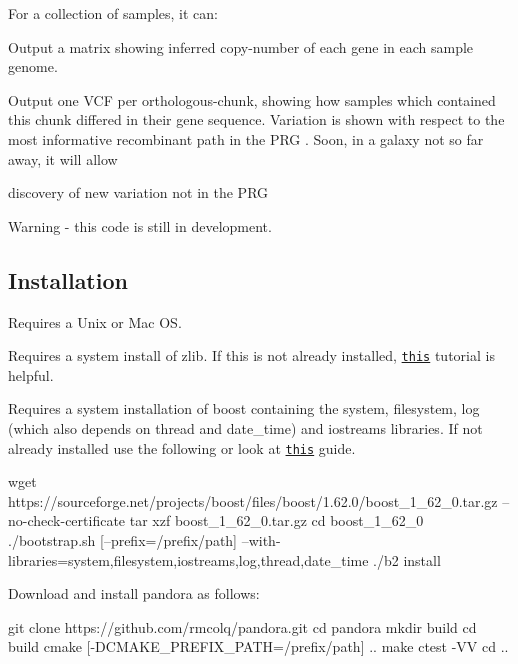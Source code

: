 For a collection of samples, it can\+:


\begin{DoxyItemize}
\item Output a matrix showing inferred copy-\/number of each gene in each sample genome.
\item Output one V\+CF per orthologous-\/chunk, showing how samples which contained this chunk differed in their gene sequence. Variation is shown with respect to the most informative recombinant path in the P\+RG . Soon, in a galaxy not so far away, it will allow
\begin{DoxyItemize}
\item discovery of new variation not in the P\+RG
\end{DoxyItemize}
\end{DoxyItemize}

Warning -\/ this code is still in development.

\subsection*{Installation}


\begin{DoxyItemize}
\item Requires a Unix or Mac OS.
\item Requires a system install of {\ttfamily zlib}. If this is not already installed, \href{https://geeksww.com/tutorials/libraries/zlib/installation/installing_zlib_on_ubuntu_linux.php}{\tt this} tutorial is helpful.
\item Requires a system installation of {\ttfamily boost} containing the {\ttfamily system}, {\ttfamily filesystem}, {\ttfamily log} (which also depends on {\ttfamily thread} and {\ttfamily date\+\_\+time}) and {\ttfamily iostreams} libraries. If not already installed use the following or look at \href{https://www.boost.org/doc/libs/1_62_0/more/getting_started/unix-variants.html}{\tt this} guide. \begin{DoxyVerb}wget https://sourceforge.net/projects/boost/files/boost/1.62.0/boost_1_62_0.tar.gz --no-check-certificate
tar xzf boost_1_62_0.tar.gz
cd boost_1_62_0
./bootstrap.sh [--prefix=/prefix/path] --with-libraries=system,filesystem,iostreams,log,thread,date_time
./b2 install
\end{DoxyVerb}

\item Download and install {\ttfamily pandora} as follows\+: \begin{DoxyVerb}git clone https://github.com/rmcolq/pandora.git
cd pandora
mkdir build
cd build
cmake [-DCMAKE_PREFIX_PATH=/prefix/path] ..
make
ctest -VV
cd ..
\end{DoxyVerb}

\end{DoxyItemize}

